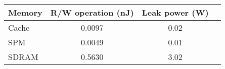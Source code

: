 
\begin{tabular}{|l|c|c|c|}
\hline
\textbf{Memory} & \textbf{R/W operation (nJ)} & \textbf{Leak power (W)}\\
\hline
Cache & 0.0097 & 0.02\\ \hline
SPM & 0.0049 & 0.01\\ \hline
SDRAM & 0.5630 & 3.02\\ \hline
\end{tabular}
